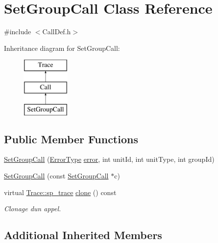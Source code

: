 \hypertarget{class_set_group_call}{}\section{Set\+Group\+Call Class Reference}
\label{class_set_group_call}


{\ttfamily \#include $<$Call\+Def.\+h$>$}

Inheritance diagram for Set\+Group\+Call\+:\begin{figure}[H]
\begin{center}
\leavevmode
\includegraphics[height=3.000000cm]{class_set_group_call}
\end{center}
\end{figure}
\subsection*{Public Member Functions}
\begin{DoxyCompactItemize}
\item 
\hyperlink{class_set_group_call_a0806e6a027a216a9baaf58cd96d8c09a}{Set\+Group\+Call} (\hyperlink{class_call_ade833a08ce215aaa4121102f3448c898}{Error\+Type} \hyperlink{class_call_a206f6150a8038fda48c17c2c7421aed1}{error}, int unit\+Id, int unit\+Type, int group\+Id)
\item 
\hyperlink{class_set_group_call_ac22755b522982956e681f654be0b5b23}{Set\+Group\+Call} (const \hyperlink{class_set_group_call}{Set\+Group\+Call} $\ast$c)
\item 
virtual \hyperlink{class_trace_a9c58e523529fc8a03fb6acf3eef86150}{Trace\+::sp\+\_\+trace} \hyperlink{class_set_group_call_ac970b30cd2a4769ec134ba451768ee64}{clone} () const 
\begin{DoxyCompactList}\small\item\em Clonage d\textquotesingle{}un appel. \end{DoxyCompactList}\end{DoxyCompactItemize}
\subsection*{Additional Inherited Members}


